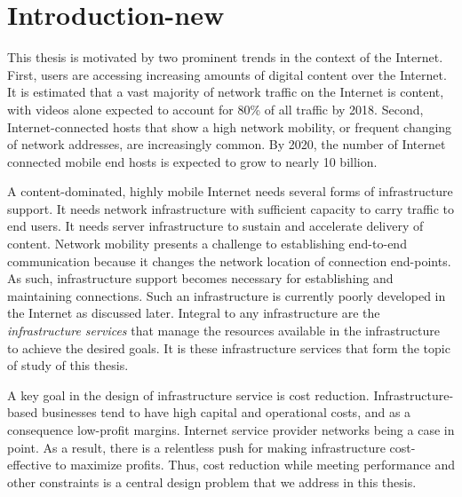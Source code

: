 \chapter{Introduction-new}

This thesis is motivated by two prominent trends in the context of the Internet. First, users are accessing increasing amounts of digital content over the Internet. It is estimated that a vast majority of network traffic on the Internet is content, with videos alone expected to account for 80\% of all traffic by 2018. Second, Internet-connected hosts that show a high network mobility, or frequent changing of network addresses, are increasingly common. By 2020, the number of Internet connected mobile end hosts is expected to grow to nearly 10 billion.

A content-dominated, highly mobile Internet needs several forms of infrastructure support. It needs network infrastructure with sufficient capacity to carry traffic to end users. It needs server infrastructure to sustain and accelerate delivery of content. 
Network mobility presents a challenge to establishing end-to-end communication because it changes the network location of connection end-points. As such, infrastructure support becomes necessary for establishing and maintaining connections. Such an infrastructure is currently poorly developed in the Internet as discussed later. Integral to any infrastructure are the \emph{infrastructure services} that manage the resources available in the infrastructure to achieve the desired goals. It is these infrastructure services that form the topic of study of this thesis.

A key goal in the design of infrastructure service is cost reduction. Infrastructure-based businesses tend to have high capital and operational costs, and as a consequence low-profit margins. Internet service provider networks being a case in point. As a result, there is a relentless push for making infrastructure cost-effective to maximize profits. Thus, cost reduction while meeting performance and other constraints is a central design problem that we address in this thesis. 

